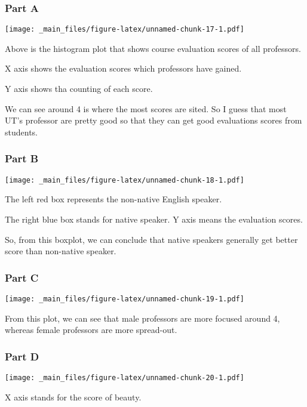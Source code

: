 \documentclass[
]{article}
\begin{document}
\hypertarget{part-a-2}{%
\subsubsection{Part A}\label{part-a-2}}

\texttt{[image: \_main\_files/figure-latex/unnamed-chunk-17-1.pdf]}

Above is the histogram plot that shows course evaluation scores of all professors.

X axis shows the evaluation scores which professors have gained.

Y axis shows tha counting of each score.

We can see around 4 is where the most scores are sited. So I guess that most UT's professor are pretty good so that they can get good evaluations scores from students.

\hypertarget{part-b-2}{%
\subsubsection{Part B}\label{part-b-2}}

\texttt{[image: \_main\_files/figure-latex/unnamed-chunk-18-1.pdf]}

The left red box represents the non-native English speaker.

The right blue box stands for native speaker. Y axis means the evaluation scores.

So, from this boxplot, we can conclude that native speakers generally get better score than non-native speaker.

\hypertarget{part-c-1}{%
\subsubsection{Part C}\label{part-c-1}}

\texttt{[image: \_main\_files/figure-latex/unnamed-chunk-19-1.pdf]}

From this plot, we can see that male professors are more focused around 4, whereas female professors are more spread-out.

\hypertarget{part-d}{%
\subsubsection{Part D}\label{part-d}}

\texttt{[image: \_main\_files/figure-latex/unnamed-chunk-20-1.pdf]}

X axis stands for the score of beauty.
\end{document}
